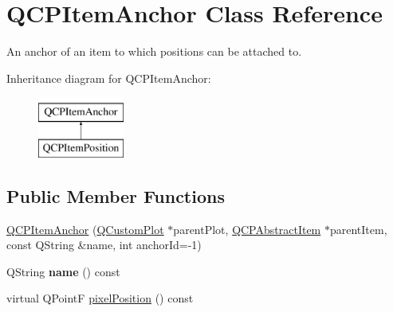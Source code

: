 \hypertarget{class_q_c_p_item_anchor}{}\section{Q\+C\+P\+Item\+Anchor Class Reference}
\label{class_q_c_p_item_anchor}


An anchor of an item to which positions can be attached to.  


Inheritance diagram for Q\+C\+P\+Item\+Anchor\+:\begin{figure}[H]
\begin{center}
\leavevmode
\includegraphics[height=2.000000cm]{class_q_c_p_item_anchor}
\end{center}
\end{figure}
\subsection*{Public Member Functions}
\begin{DoxyCompactItemize}
\item 
\hyperlink{class_q_c_p_item_anchor_a32573023c6fa65b4496f1f995e5bfa5f}{Q\+C\+P\+Item\+Anchor} (\hyperlink{class_q_custom_plot}{Q\+Custom\+Plot} $\ast$parent\+Plot, \hyperlink{class_q_c_p_abstract_item}{Q\+C\+P\+Abstract\+Item} $\ast$parent\+Item, const Q\+String \&name, int anchor\+Id=-\/1)
\item 
\mbox{\label{class_q_c_p_item_anchor_aad37cdf5a3f63428f61be739014e212e}} 
Q\+String {\bfseries name} () const
\item 
virtual Q\+PointF \hyperlink{class_q_c_p_item_anchor_a06dcfb7220d26eee93eef56ae66582cb}{pixel\+Position} () const
\end{DoxyCompactItemize}
